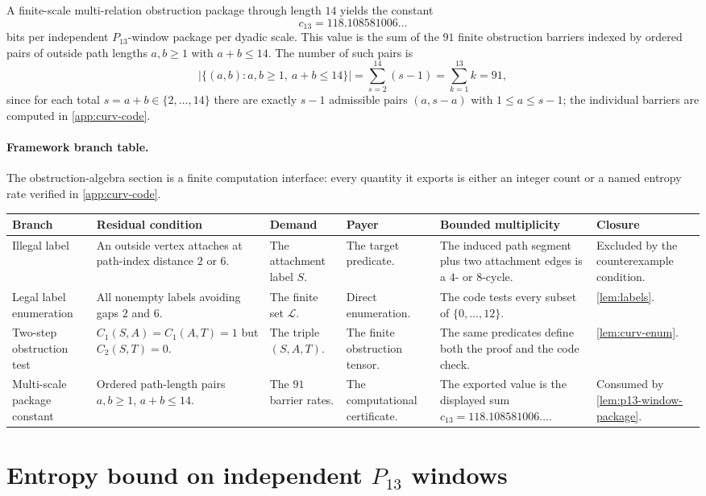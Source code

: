 \documentclass[11pt]{article}
\newcommand{\labels}{\mathcal L}
\newcommand{\FrameworkBranchTableHeader}{%
\toprule
\textbf{Branch} & \textbf{Residual condition} & \textbf{Demand} & \textbf{Payer} & \textbf{Bounded multiplicity} & \textbf{Closure}\\
\midrule
}
\begin{document}
A finite-scale multi-relation obstruction package through length $14$ yields the constant
\[
\boxed{c_{13}=118.108581006\ldots}
\]
bits per independent $P_{13}$-window package per dyadic scale.  This value is the sum of the $91$ finite obstruction barriers indexed by ordered pairs of outside path lengths $a,b\ge1$ with $a+b\le14$.  The number of such pairs is
\[
\bigl|\{(a,b):a,b\ge1,\ a+b\le14\}\bigr|=\sum_{s=2}^{14}(s-1)=\sum_{k=1}^{13}k=91,
\]
since for each total $s=a+b\in\{2,\ldots,14\}$ there are exactly $s-1$ admissible pairs $(a,s-a)$ with $1\le a\le s-1$; the individual barriers are computed in \cref{app:curv-code}.

\paragraph{Framework branch table.}
The obstruction-algebra section is a finite computation interface: every
quantity it exports is either an integer count or a named entropy rate
verified in \cref{app:curv-code}.
\begin{longtable}{L{0.13\textwidth} L{0.19\textwidth} L{0.14\textwidth} L{0.14\textwidth} L{0.17\textwidth} L{0.17\textwidth}}
\FrameworkBranchTableHeader
Illegal label
&
An outside vertex attaches at path-index distance \(2\) or \(6\).
&
The attachment label \(S\).
&
The target predicate.
&
The induced path segment plus two attachment edges is a \(4\)- or \(8\)-cycle.
&
Excluded by the counterexample condition.
\\
\addlinespace
Legal label enumeration
&
All nonempty labels avoiding gaps \(2\) and \(6\).
&
The finite set \(\labels\).
&
Direct enumeration.
&
The code tests every subset of \(\{0,\ldots,12\}\).
&
\cref{lem:labels}.
\\
\addlinespace
Two-step obstruction test
&
\(C_1(S,A)=C_1(A,T)=1\) but \(C_2(S,T)=0\).
&
The triple \((S,A,T)\).
&
The finite obstruction tensor.
&
The same predicates define both the proof and the code check.
&
\cref{lem:curv-enum}.
\\
\addlinespace
Multi-scale package constant
&
Ordered path-length pairs \(a,b\ge1\), \(a+b\le14\).
&
The \(91\) barrier rates.
&
The computational certificate.
&
The exported value is the displayed sum \(c_{13}=118.108581006\ldots\).
&
Consumed by \cref{lem:p13-window-package}.
\\
\bottomrule
\end{longtable}

\section{Entropy bound on independent \texorpdfstring{$P_{13}$}{P13} windows}\label{sec:entropy-bound}
\end{document}
